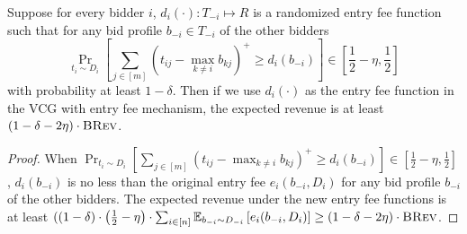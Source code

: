\begin{lemma}\label{lem:approximate entry fee for BREV}
	Suppose for every bidder $i$, $d_i(\cdot): T_{-i}\mapsto R$ is a randomized entry fee function such that for any bid profile $b_{-i}\in T_{-i}$ of the other bidders $$\Pr_{t_i\sim D_i}\left[\sum_{j\in[m]} \left(t_{ij}-\max_{k\neq i} b_{kj}\right)^+\geq d_i(b_{-i})\right]\in\left[\frac{1}{2}-\eta,\frac{1}{2}\right]$$ with probability at least $1-\delta$. 
	Then if we use $d_i(\cdot)$ as the entry fee function in the VCG with entry fee mechanism, the expected revenue is at least %
	$\left(1-\delta-2\eta\right)\cdot\textsc{BRev}$.
\end{lemma}
\begin{proof}
	When $\Pr_{t_i\sim D_i}\left[\sum_{j\in[m]} \left(t_{ij}-\max_{k\neq i} b_{kj}\right)^+\geq d_i(b_{-i})\right]\in\left[\frac{1}{2}-\eta,\frac{1}{2}\right]$, $d_i(b_{-i})$ is no less than the original entry fee $e_i(b_{-i}, D_i)$ for any bid profile $b_{-i}$ of the other bidders. The expected revenue under the new entry fee functions is at least $(\left(1-\delta\right)\cdot\left(\frac{1}{2}-\eta\right)\cdot \sum_{i\in[n]} {\mathbb{E}}_{b_{-i}\sim D_{-i}}\left[e_i(b_{-i},D_i)\right]
 	\geq \left(1-\delta-2\eta\right)\cdot\textsc{BRev}$.
\end{proof}

